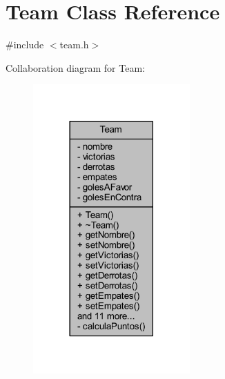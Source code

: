 \hypertarget{class_team}{}\section{Team Class Reference}
\label{class_team}


{\ttfamily \#include $<$team.\+h$>$}



Collaboration diagram for Team\+:
\nopagebreak
\begin{figure}[H]
\begin{center}
\leavevmode
\includegraphics[width=170pt]{d1/d3f/class_team__coll__graph}
\end{center}
\end{figure}
